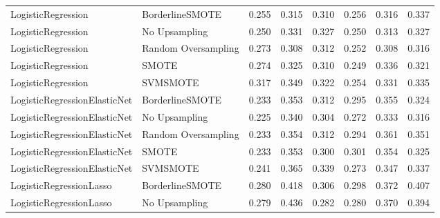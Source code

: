 \begin{tabular}{llllllll}
          LogisticRegression &     BorderlineSMOTE & 0.255 &                     0.315 &                 0.310 &                  0.256 &                                   0.316 &     0.337 \\
          LogisticRegression &       No Upsampling & 0.250 &                     0.331 &                 0.327 &                  0.250 &                                   0.313 &     0.327 \\
          LogisticRegression & Random Oversampling & 0.273 &                     0.308 &                 0.312 &                  0.252 &                                   0.308 &     0.316 \\
          LogisticRegression &               SMOTE & 0.274 &                     0.325 &                 0.310 &                  0.249 &                                   0.336 &     0.321 \\
          LogisticRegression &            SVMSMOTE & 0.317 &                     0.349 &                 0.322 &                  0.254 &                                   0.331 &     0.335 \\
LogisticRegressionElasticNet &     BorderlineSMOTE & 0.233 &                     0.353 &                 0.312 &                  0.295 &                                   0.355 &     0.324 \\
LogisticRegressionElasticNet &       No Upsampling & 0.225 &                     0.340 &                 0.304 &                  0.272 &                                   0.333 &     0.316 \\
LogisticRegressionElasticNet & Random Oversampling & 0.233 &                     0.354 &                 0.312 &                  0.294 &                                   0.361 &     0.351 \\
LogisticRegressionElasticNet &               SMOTE & 0.233 &                     0.353 &                 0.300 &                  0.301 &                                   0.354 &     0.325 \\
LogisticRegressionElasticNet &            SVMSMOTE & 0.241 &                     0.365 &                 0.339 &                  0.273 &                                   0.347 &     0.337 \\
     LogisticRegressionLasso &     BorderlineSMOTE & 0.280 &                     0.418 &                 0.306 &                  0.298 &                                   0.372 &     0.407 \\
     LogisticRegressionLasso &       No Upsampling & 0.279 &                     0.436 &                 0.282 &                  0.280 &                                   0.370 &     0.394 \\

\end{tabular}
